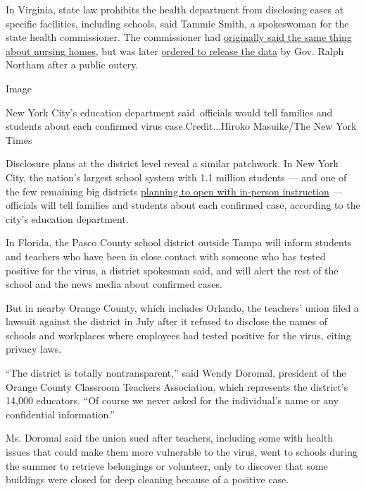 In Virginia, state law prohibits the health department from disclosing
cases at specific facilities, including schools, said Tammie Smith, a
spokeswoman for the state health commissioner. The commissioner had
\href{https://www.whsv.com/content/news/After-months-Va-health-department-releases-detailed-info-on-long-term-care-facility-outbreaks-571373611.html}{originally
said the same thing about nursing homes}, but was later
\href{https://www.washingtonpost.com/local/virginia-nursing-homes-walk-tightrope/2020/06/27/7a14c2da-b64f-11ea-a510-55bf26485c93_story.html}{ordered
to release the data} by Gov. Ralph Northam after a public outcry.

Image

New York City's education department said~officials would tell families
and students about each confirmed virus case.Credit...Hiroko Masuike/The
New York Times

Disclosure plans at the district level reveal a similar patchwork. In
New York City, the nation's largest school system with 1.1 million
students --- and one of the few remaining big districts
\href{https://www.nytimes3xbfgragh.onion/2020/08/18/nyregion/schools-reopen-nyc.html}{planning
to open with in-person instruction} --- officials will tell families and
students about each confirmed case, according to the city's education
department.

In Florida, the Pasco County school district outside Tampa will inform
students and teachers who have been in close contact with someone who
has tested positive for the virus, a district spokesman said, and will
alert the rest of the school and the news media about confirmed cases.

But in nearby Orange County, which includes Orlando, the teachers' union
filed a lawsuit against the district in July after it refused to
disclose the names of schools and workplaces where employees had tested
positive for the virus, citing privacy laws.

``The district is totally nontransparent,'' said Wendy Doromal,
president of the Orange County Classroom Teachers Association, which
represents the district's 14,000 educators. ``Of course we never asked
for the individual's name or any confidential information.''

Ms. Doromal said the union sued after teachers, including some with
health issues that could make them more vulnerable to the virus, went to
schools during the summer to retrieve belongings or volunteer, only to
discover that some buildings were closed for deep cleaning because of a
positive case.

